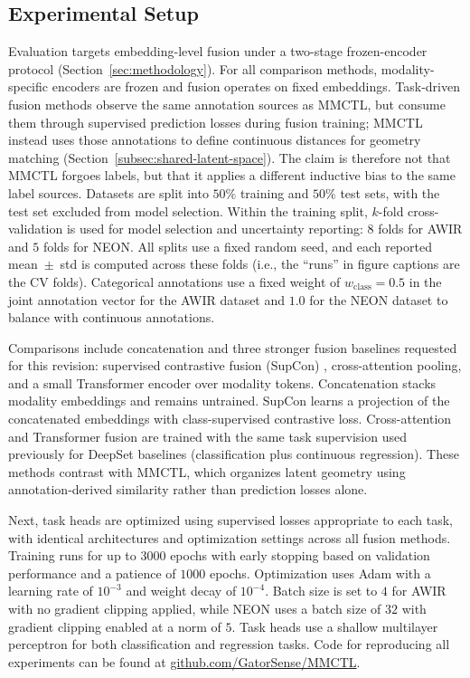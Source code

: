 \documentclass[lettersize,journal]{IEEEtran}
\begin{document}
\subsection{Experimental Setup}
Evaluation targets embedding-level fusion under a two-stage frozen-encoder protocol (Section~\ref{sec:methodology}). For all comparison methods, modality-specific encoders are frozen and fusion operates on fixed embeddings. Task-driven fusion methods observe the same annotation sources as MMCTL, but consume them through supervised prediction losses during fusion training; MMCTL instead uses those annotations to define continuous distances for geometry matching (Section~\ref{subsec:shared-latent-space}). The claim is therefore not that MMCTL forgoes labels, but that it applies a different inductive bias to the same label sources. Datasets are split into $50\%$ training and $50\%$ test sets, with the test set excluded from model selection. Within the training split, $k$-fold cross-validation is used for model selection and uncertainty reporting: $8$ folds for AWIR and $5$ folds for NEON. All splits use a fixed random seed, and each reported mean~$\pm$~std is computed across these folds (i.e., the ``runs'' in figure captions are the CV folds). Categorical annotations use a fixed weight of $w_{\text{class}} = 0.5$ in the joint annotation vector for the AWIR dataset and $1.0$ for the NEON dataset to balance with continuous annotations.

Comparisons include concatenation and three stronger fusion baselines requested for this revision: supervised contrastive fusion (SupCon) \cite{khosla2020supervised}, cross-attention pooling, and a small Transformer encoder over modality tokens. Concatenation stacks modality embeddings and remains untrained. SupCon learns a projection of the concatenated embeddings with class-supervised contrastive loss. Cross-attention and Transformer fusion are trained with the same task supervision used previously for DeepSet baselines (classification plus continuous regression). These methods contrast with MMCTL, which organizes latent geometry using annotation-derived similarity rather than prediction losses alone.

Next, task heads are optimized using supervised losses appropriate to each task, with identical architectures and optimization settings across all fusion methods. Training runs for up to $3000$ epochs with early stopping based on validation performance and a patience of $1000$ epochs. Optimization uses Adam with a learning rate of $10^{-3}$ and weight decay of $10^{-4}$. Batch size is set to $4$ for AWIR with no gradient clipping applied, while NEON uses a batch size of $32$ with gradient clipping enabled at a norm of $5$. Task heads use a shallow multilayer perceptron for both classification and regression tasks. Code for reproducing all experiments can be found at
\href{https://github.com/GatorSense/MMCTL}{github.com/GatorSense/MMCTL}.
\end{document}
